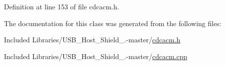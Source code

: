 \-Definition at line 153 of file cdcacm.\-h.



\-The documentation for this class was generated from the following files\-:\begin{DoxyCompactItemize}
\item 
\-Included Libraries/\-U\-S\-B\-\_\-\-Host\-\_\-\-Shield\-\_.-\/master/\hyperlink{cdcacm_8h}{cdcacm.\-h}\item 
\-Included Libraries/\-U\-S\-B\-\_\-\-Host\-\_\-\-Shield\-\_.-\/master/\hyperlink{cdcacm_8cpp}{cdcacm.\-cpp}\end{DoxyCompactItemize}
